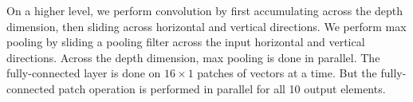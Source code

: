 On a higher level, we perform convolution by first accumulating across the depth dimension, then sliding across horizontal and vertical directions. We perform max pooling by sliding a pooling filter across the input horizontal and vertical directions. Across the depth dimension, max pooling is done in parallel. The fully-connected layer is done on $16 \times 1$ patches of vectors at a time. But the fully-connected patch operation is performed in parallel for all 10 output elements.